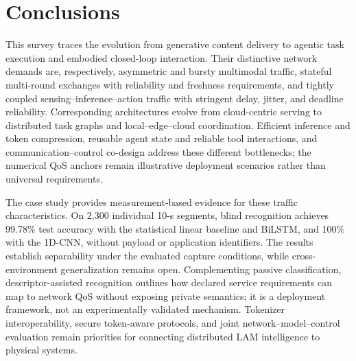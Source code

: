 \documentclass[letterpaper,journal]{IEEEtran}
\begin{document}
\section{Conclusions}
\label{sec:conclusion}
This survey traces the evolution from generative content delivery to agentic
task execution and embodied closed-loop interaction. Their distinctive
network demands are, respectively, asymmetric and bursty multimodal traffic,
stateful multi-round exchanges with reliability and freshness requirements,
and tightly coupled sensing--inference--action traffic with stringent delay,
jitter, and deadline reliability. Corresponding architectures evolve from
cloud-centric serving to distributed task graphs and local--edge--cloud
coordination. Efficient inference and token compression, reusable agent state
and reliable tool interactions, and communication--control co-design address
these different bottlenecks; the numerical QoS anchors remain illustrative
deployment scenarios rather than universal requirements.

The case study provides measurement-based evidence for these traffic
characteristics. On 2,300 individual 10-s segments, blind recognition achieves
99.78\% test accuracy with the statistical linear baseline and BiLSTM, and
100\% with the 1D-CNN, without payload or application identifiers. The results
establish separability under the evaluated capture conditions, while
cross-environment generalization remains open. Complementing passive
classification, descriptor-assisted recognition outlines how declared service
requirements can map to network QoS without exposing private semantics; it
is a deployment framework, not an experimentally validated mechanism.
Tokenizer interoperability, secure token-aware protocols, and joint
network--model--control evaluation remain priorities for connecting
distributed LAM intelligence to physical systems.
\end{document}
